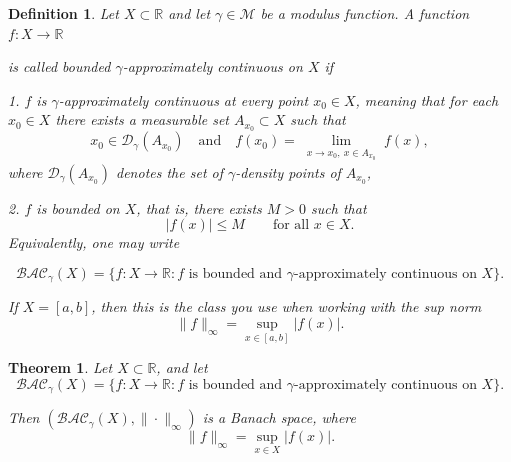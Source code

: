 \documentclass{amsart}
\newtheorem{theorem}{Theorem}
\theoremstyle{plain}
\newtheorem{definition}{Definition}
\numberwithin{equation}{section}
\begin{document}
\begin{definition}
Let $X\subset \mathbb{R}$ and let $\gamma\in \mathcal{M}$ be a modulus function. A function $ f:X\to \mathbb{R}$

is called bounded $\gamma$-approximately continuous on $X$ if

1. $f$ is $\gamma$-approximately continuous at every point $x_0\in X$, meaning that for each $x_0\in X$ there exists a measurable set $A_{x_0}\subset X$ such that
$$ x_0\in \mathcal{D}_\gamma(A_{x_0}) \quad \text{and} \quad
f(x_0)=\lim_{\substack{x\to x_0,\ x\in A_{x_0}}} f(x), $$
where $\mathcal{D}_\gamma(A_{x_0})$ denotes the set of $\gamma$-density points of $A_{x_0}$,

2. $f$ is bounded on $X$, that is, there exists $M>0$ such that
$$ |f(x)|\leq M \qquad \text{for all } x\in X. $$
Equivalently, one may write

$$ \mathcal{BAC}_\gamma(X)=\{f:X\to \mathbb{R}: f \text{ is bounded and } \gamma\text{-approximately continuous on } X\}.$$

If $X=[a,b]$, then this is the class you use when working with the sup norm
$$ \|f\|_\infty=\sup_{x\in [a,b]} |f(x)|. $$

\end{definition}
\begin{theorem}
Let $X\subset \mathbb{R}$, and let
$$ \mathcal{BAC}_\gamma(X)=\{f:X\to \mathbb{R}: f \text{ is bounded and } \gamma\text{-approximately continuous on } X\}.$$

Then $(\mathcal{BAC}_\gamma(X), \|\cdot\|_\infty)$ is a Banach space, where
$$ \|f\|_\infty=\sup_{x\in X} |f(x)|. $$
\end{theorem}
\end{document}
